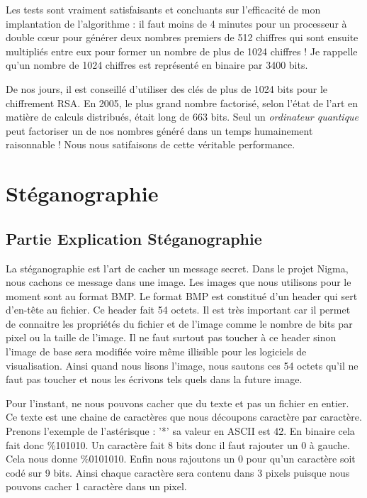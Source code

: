 \documentclass[a4paper,12pt]{article}
\begin{document}
Les tests sont vraiment satisfaisants et concluants sur l'efficacité de mon implantation de l'algorithme : il faut moins de 4 minutes pour un processeur à double c\oe{}ur pour générer deux nombres premiers de 512 chiffres qui sont ensuite multipliés entre eux pour former un nombre de plus de 1024 chiffres ! Je rappelle qu'un nombre de 1024 chiffres est représenté en binaire par 3400 bits.

De nos jours, il est conseillé d'utiliser des clés de plus de 1024 bits pour le chiffrement RSA. En 2005, le plus grand nombre factorisé, selon l'état de l'art en matière de calculs distribués, était long de 663 bits. Seul un \emph{ordinateur quantique} peut factoriser un de nos nombres généré dans un temps humainement raisonnable ! Nous nous satifaisons de cette véritable performance.

\newpage

\section{Stéganographie}
\subsection{Partie Explication Stéganographie}

La stéganographie est l'art de cacher un message secret. Dans le projet Nigma, nous cachons ce message dans une image. Les images que nous utilisons pour le moment sont au format BMP. Le format BMP est constitué d'un header qui sert d'en-tête au fichier. Ce header fait 54 octets. Il est très important car il permet de connaitre les propriétés du fichier et de l'image comme le nombre de bits par pixel ou la taille de l'image. Il ne faut surtout pas toucher à ce header sinon l'image de base sera modifiée voire même illisible pour les logiciels de visualisation. Ainsi quand nous lisons l'image, nous sautons ces 54 octets qu'il ne faut pas toucher et nous les écrivons tels quels dans la future image.

Pour l'instant, ne nous pouvons cacher que du texte et pas un fichier en entier. Ce texte est une chaine de caractères que nous découpons caractère par caractère. Prenons l'exemple de l'astérisque : '*' sa valeur en ASCII est 42. En binaire cela fait donc \%101010. Un caractère fait 8 bits donc il faut rajouter un 0 à gauche. Cela nous donne \%0101010. Enfin nous rajoutons un 0 pour qu’un caractère soit codé sur 9 bits. Ainsi chaque caractère sera contenu dans 3 pixels puisque nous pouvons cacher 1 caractère dans un pixel.
\end{document}
